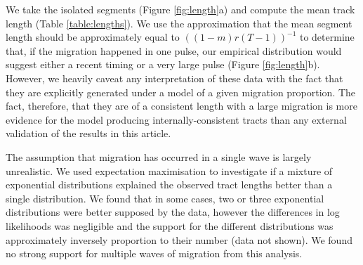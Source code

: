 \documentclass{article}
\begin{document}
We take the isolated segments (Figure \ref{fig:length}a) and compute the mean track length (Table \ref{table:lengths}). We use the approximation that the mean segment length should be approximately equal to $((1-m)r(T-1))^{-1}$ to determine that, if the migration happened in one pulse, our empirical distribution would suggest either a recent timing or a very large pulse (Figure \ref{fig:length}b). However, we heavily caveat any interpretation of these data with the fact that they are explicitly generated under a model of a given migration proportion. The fact, therefore, that they are of a consistent length with a large migration is more evidence for the model producing internally-consistent tracts than any external validation of the results in this article. 

The assumption that migration has occurred in a single wave is largely unrealistic. We used expectation maximisation to investigate if a mixture of exponential distributions explained the observed tract lengths better than a single distribution. We found that in some cases, two or three exponential distributions were better supposed by the data, however the differences in log likelihoods was negligible and the support for the different distributions was approximately inversely proportion to their number (data not shown). We found no strong support for multiple waves of migration from this analysis.
\end{document}
